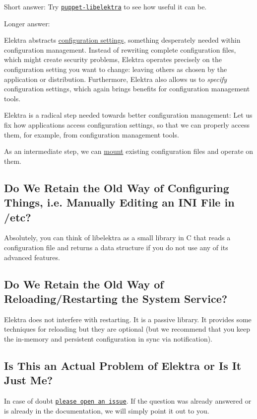 Short answer\+: Try \href{https://puppet.libelektra.org}{\tt puppet-\/libelektra} to see how useful it can be.

Longer answer\+:

Elektra abstracts \hyperlink{doc_help_elektra-glossary_md}{configuration settings}, something desperately needed within configuration management. Instead of rewriting complete configuration files, which might create security problems, Elektra operates precisely on the configuration setting you want to change\+: leaving others as chosen by the application or distribution. Furthermore, Elektra also allows us to {\itshape specify} configuration settings, which again brings benefits for configuration management tools.

Elektra is a radical step needed towards better configuration management\+: Let us fix how applications access configuration settings, so that we can properly access them, for example, from configuration management tools.

As an intermediate step, we can \hyperlink{doc_help_elektra-mounting_md}{mount} existing configuration files and operate on them.

\subsection*{Do We Retain the Old Way of Configuring Things, i.\+e. Manually Editing an I\+NI File in /etc?}

Absolutely, you can think of libelektra as a small library in C that reads a configuration file and returns a data structure if you do not use any of its advanced features.

\subsection*{Do We Retain the Old Way of Reloading/\+Restarting the System Service?}

Elektra does not interfere with restarting. It is a passive library. It provides some techniques for reloading but they are optional (but we recommend that you keep the in-\/memory and persistent configuration in sync via notification).

\subsection*{Is This an Actual Problem of Elektra or Is It Just Me?}

In case of doubt \href{https://git.libelektra.org/issues}{\tt please open an issue}. If the question was already answered or is already in the documentation, we will simply point it out to you.

